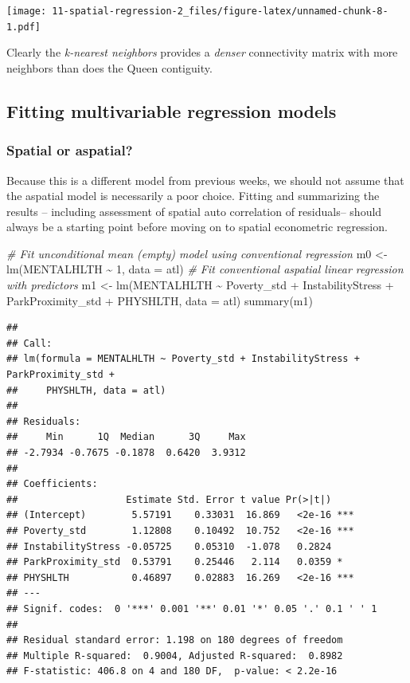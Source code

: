 \documentclass[
]{book}
\newenvironment{Shaded}{\begin{snugshade}}{\end{snugshade}}
\newcommand{\AttributeTok}[1]{\textcolor[rgb]{0.77,0.63,0.00}{#1}}
\newcommand{\CommentTok}[1]{\textcolor[rgb]{0.56,0.35,0.01}{\textit{#1}}}
\newcommand{\DecValTok}[1]{\textcolor[rgb]{0.00,0.00,0.81}{#1}}
\newcommand{\FunctionTok}[1]{\textcolor[rgb]{0.00,0.00,0.00}{#1}}
\newcommand{\NormalTok}[1]{#1}
\newcommand{\OtherTok}[1]{\textcolor[rgb]{0.56,0.35,0.01}{#1}}
\newcommand{\SpecialCharTok}[1]{\textcolor[rgb]{0.00,0.00,0.00}{#1}}
\begin{document}
\texttt{[image: 11-spatial-regression-2\_files/figure-latex/unnamed-chunk-8-1.pdf]}

Clearly the \emph{k-nearest neighbors} provides a \emph{denser} connectivity matrix with more neighbors than does the Queen contiguity.

\hypertarget{fitting-multivariable-regression-models}{%
\subsection{Fitting multivariable regression models}\label{fitting-multivariable-regression-models}}

\hypertarget{spatial-or-aspatial}{%
\subsubsection{Spatial or aspatial?}\label{spatial-or-aspatial}}

Because this is a different model from previous weeks, we should not assume that the aspatial model is necessarily a poor choice. Fitting and summarizing the results -- including assessment of spatial auto correlation of residuals-- should always be a starting point before moving on to spatial econometric regression.

\begin{Shaded}
\begin{Highlighting}[]
\CommentTok{\# Fit unconditional mean (empty) model using conventional regression}
\NormalTok{m0 }\OtherTok{\textless{}{-}} \FunctionTok{lm}\NormalTok{(MENTALHLTH }\SpecialCharTok{\textasciitilde{}} \DecValTok{1}\NormalTok{,}
         \AttributeTok{data =}\NormalTok{ atl)}
\CommentTok{\# Fit conventional aspatial linear regression with predictors}
\NormalTok{m1 }\OtherTok{\textless{}{-}} \FunctionTok{lm}\NormalTok{(MENTALHLTH }\SpecialCharTok{\textasciitilde{}}\NormalTok{ Poverty\_std }\SpecialCharTok{+}\NormalTok{ InstabilityStress }\SpecialCharTok{+}\NormalTok{ ParkProximity\_std  }\SpecialCharTok{+}\NormalTok{ PHYSHLTH,}
         \AttributeTok{data =}\NormalTok{ atl)}
\FunctionTok{summary}\NormalTok{(m1)}
\end{Highlighting}
\end{Shaded}

\begin{verbatim}
## 
## Call:
## lm(formula = MENTALHLTH ~ Poverty_std + InstabilityStress + ParkProximity_std + 
##     PHYSHLTH, data = atl)
## 
## Residuals:
##     Min      1Q  Median      3Q     Max 
## -2.7934 -0.7675 -0.1878  0.6420  3.9312 
## 
## Coefficients:
##                   Estimate Std. Error t value Pr(>|t|)    
## (Intercept)        5.57191    0.33031  16.869   <2e-16 ***
## Poverty_std        1.12808    0.10492  10.752   <2e-16 ***
## InstabilityStress -0.05725    0.05310  -1.078   0.2824    
## ParkProximity_std  0.53791    0.25446   2.114   0.0359 *  
## PHYSHLTH           0.46897    0.02883  16.269   <2e-16 ***
## ---
## Signif. codes:  0 '***' 0.001 '**' 0.01 '*' 0.05 '.' 0.1 ' ' 1
## 
## Residual standard error: 1.198 on 180 degrees of freedom
## Multiple R-squared:  0.9004, Adjusted R-squared:  0.8982 
## F-statistic: 406.8 on 4 and 180 DF,  p-value: < 2.2e-16
\end{verbatim}
\end{document}
